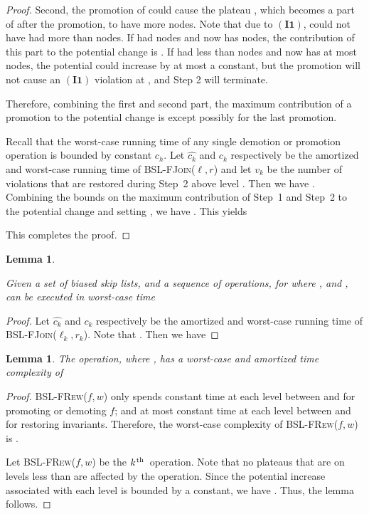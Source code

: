 \documentclass[11pt]{article}
\newcommand{\ens}[1]{\ensuremath{#1}}
\newcommand{\kth}{\ens{k^{ \mbox{\hspace{.2mm}\scriptsize th}}}}
\newcommand{\Bslfjoinx}[2]{\mbox{\textsc{BSL-FJoin(\ensuremath{#1,#2})}}}
\newcommand{\Bslfrewx}[2]{\mbox{\textsc{BSL-FRew(\ensuremath{#1,#2})}}}
\newcommand{\cons}[1]{\ensuremath{c_{#1}}}
\newcommand{\cnsh}{\cons h}
\newcommand{\invone}{\ensuremath{\mathbf{(I1)}}}
\newcommand{\node}[1]{\ensuremath{#1}}
\newcommand{\vionum}[1]{\ensuremath{v_{#1}}}
\newcommand{\amcost}[1]{\ensuremath{\hat{c_{#1}}}}
\newcommand{\actcost}[1]{\ensuremath{c_{#1}}}
\newcounter{count}
\newtheorem{lemma}[count]{Lemma}
\begin{document}
\begin{proof}
Second, the promotion of  could cause the plateau , which  becomes a part of after the promotion, to have more nodes. Note that due to \invone{},  could not have had more than  nodes. If  had  nodes and now has  nodes, the contribution of this part to the potential change is . If  had less than  nodes and now has at most  nodes, the potential could increase by at most a constant, but the promotion will not cause an \invone{} violation at , and Step 2 will terminate.


Therefore, combining the first and second part, the maximum contribution of a promotion to the potential change is  except possibly for the last promotion. 


Recall that the worst-case running time of any single demotion or promotion operation is bounded by constant \cnsh. Let \amcost k and \actcost k respectively be the amortized and worst-case running time of \Bslfjoinx{\ell}{r} and let \vionum k be the number of violations that are restored during Step~2 above level . 
Then we have . 
Combining the bounds on the maximum contribution of Step~1 and Step~2 to the potential change and setting , we have . 
This yields 

 
This completes the proof. 
\end{proof} 



\begin{lemma} 
\label{lem:wccostofbslfjoin} 

Given a set  of biased skip lists, and a sequence of  operations, for  where ,   and , can be executed in worst-case time 
 
 
\end{lemma} 


\begin{proof} 
Let \amcost k and \actcost k respectively be the amortized and worst-case running time of \Bslfjoinx{\ell_k}{r_k}. Note that . Then we have 

{\allowdisplaybreaks 
 
} 
\end{proof} 


\begin{lemma} 
\label{lem:costofbslfreweight} 
The  operation, where , has a worst-case and amortized time complexity of 
 
\end{lemma} 


\begin{proof} 
\Bslfrewx{f}{w} only spends constant time at each level between  and  for promoting or demoting \node f; and at most constant time at each level between  and  for restoring invariants. Therefore, the worst-case complexity of \Bslfrewx{f}{w} is . 

Let \Bslfrewx{f}{w} be the \kth\ operation. Note that no plateaus that are on levels less than  are affected by the operation. Since the potential increase associated with each level is bounded by a constant, we have . Thus, the lemma follows. 
\end{proof} 
\end{document}
